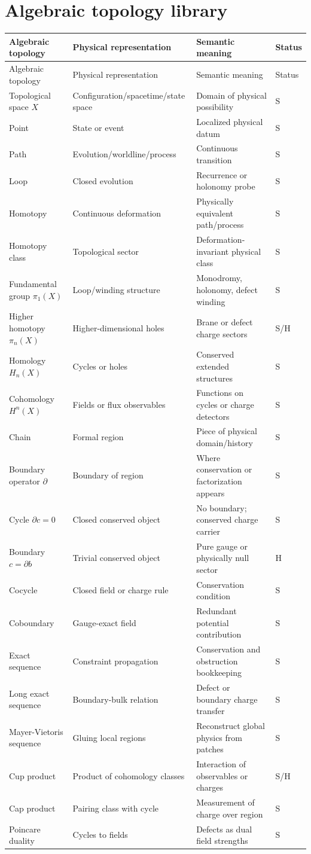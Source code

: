 \documentclass[11pt]{article}
\newcommand{\status}[1]{\textsf{#1}}
\newcommand{\entry}[4]{#1 & #2 & #3 & \status{#4}\\}
\begin{document}
\section{Algebraic topology library}
\begin{longtable}{@{}>{\raggedright\arraybackslash}p{}>{\raggedright\arraybackslash}p{}>{\raggedright\arraybackslash}p{}>{\centering\arraybackslash}p{}@{}}
\toprule
Algebraic topology & Physical representation & Semantic meaning & Status\\
\midrule
\endfirsthead
\toprule
Algebraic topology & Physical representation & Semantic meaning & Status\\
\midrule
\endhead
\bottomrule
\endfoot
\entry{Topological space $X$}{Configuration/spacetime/state space}{Domain of physical possibility}{S}
\entry{Point}{State or event}{Localized physical datum}{S}
\entry{Path}{Evolution/worldline/process}{Continuous transition}{S}
\entry{Loop}{Closed evolution}{Recurrence or holonomy probe}{S}
\entry{Homotopy}{Continuous deformation}{Physically equivalent path/process}{S}
\entry{Homotopy class}{Topological sector}{Deformation-invariant physical class}{S}
\entry{Fundamental group $\pi_1(X)$}{Loop/winding structure}{Monodromy, holonomy, defect winding}{S}
\entry{Higher homotopy $\pi_n(X)$}{Higher-dimensional holes}{Brane or defect charge sectors}{S/H}
\entry{Homology $H_n(X)$}{Cycles or holes}{Conserved extended structures}{S}
\entry{Cohomology $H^n(X)$}{Fields or flux observables}{Functions on cycles or charge detectors}{S}
\entry{Chain}{Formal region}{Piece of physical domain/history}{S}
\entry{Boundary operator $\partial$}{Boundary of region}{Where conservation or factorization appears}{S}
\entry{Cycle $\partial c=0$}{Closed conserved object}{No boundary; conserved charge carrier}{S}
\entry{Boundary $c=\partial b$}{Trivial conserved object}{Pure gauge or physically null sector}{H}
\entry{Cocycle}{Closed field or charge rule}{Conservation condition}{S}
\entry{Coboundary}{Gauge-exact field}{Redundant potential contribution}{S}
\entry{Exact sequence}{Constraint propagation}{Conservation and obstruction bookkeeping}{S}
\entry{Long exact sequence}{Boundary-bulk relation}{Defect or boundary charge transfer}{S}
\entry{Mayer-Vietoris sequence}{Gluing local regions}{Reconstruct global physics from patches}{S}
\entry{Cup product}{Product of cohomology classes}{Interaction of observables or charges}{S/H}
\entry{Cap product}{Pairing class with cycle}{Measurement of charge over region}{S}
\entry{Poincare duality}{Cycles to fields}{Defects as dual field strengths}{S}

\end{longtable}
\end{document}
